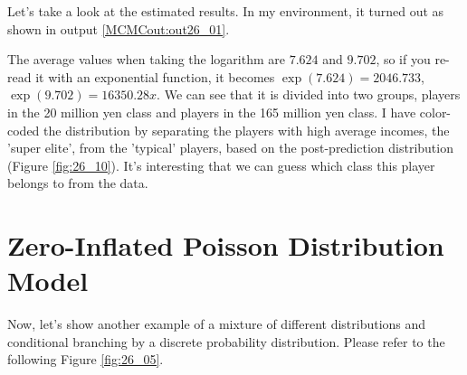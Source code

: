 \documentclass{ltjsbook}
\begin{document}
	Let's take a look at the estimated results. In my environment, it turned out as shown in output \ref{MCMCout:out26_01}.
	
	The average values when taking the logarithm are $7.624$ and $9.702$, so if you re-read it with an exponential function, it becomes $\exp(7.624)=2046.733$, $\exp(9.702)=16350.28x$. We can see that it is divided into two groups, players in the 20 million yen class and players in the 165 million yen class.
	I have color-coded the distribution by separating the players with high average incomes, the 'super elite', from the 'typical' players, based on the post-prediction distribution (Figure \ref{fig:26_10}). It's interesting that we can guess which class this player belongs to from the data.
	



	\section{Zero-Inflated Poisson Distribution Model}
	\label{ZIpoisson}
	Now, let's show another example of a mixture of different distributions and conditional branching by a discrete probability distribution. Please refer to the following Figure \ref{fig:26_05}.
	
\end{document}
